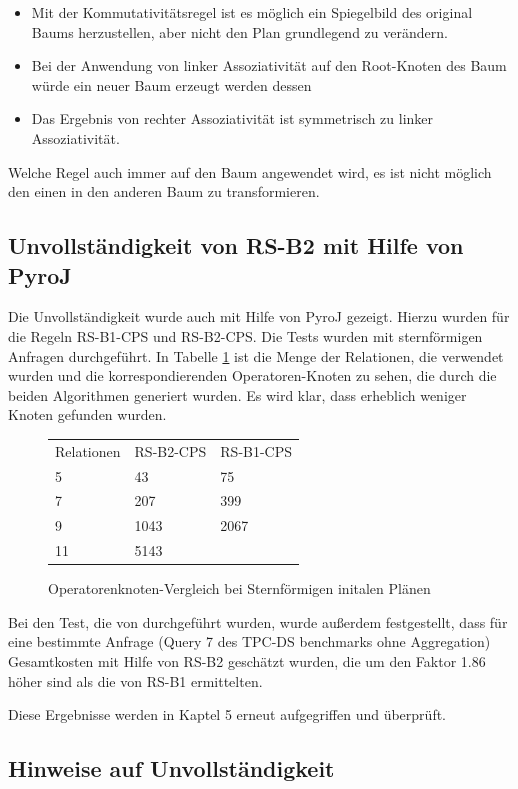 \begin{itemize}
\item Mit der Kommutativitätsregel ist es möglich ein Spiegelbild des original Baums herzustellen, aber nicht den Plan grundlegend zu verändern.
\item Bei der Anwendung von linker Assoziativität auf den Root-Knoten des Baum würde ein neuer Baum erzeugt werden dessen
\item Das Ergebnis von rechter Assoziativität ist symmetrisch zu linker Assoziativität.
\end{itemize}


Welche Regel auch immer auf den Baum angewendet wird, es ist nicht möglich den einen in den anderen Baum zu transformieren.

\subsection{Unvollständigkeit von RS-B2 mit Hilfe von PyroJ}

Die Unvollständigkeit wurde auch mit Hilfe von PyroJ gezeigt. Hierzu wurden für die Regeln RS-B1-CPS und RS-B2-CPS. Die Tests wurden mit sternförmigen Anfragen durchgeführt. In Tabelle \ref{pyroIncomplete} ist die Menge der Relationen, die verwendet wurden und die korrespondierenden Operatoren-Knoten zu sehen, die durch die beiden Algorithmen generiert wurden. Es wird klar, dass erheblich weniger Knoten gefunden wurden. 

\begin{figure}[ht]
\centering

\begin{tabular}{lll}
Relationen & RS-B2-CPS & RS-B1-CPS \\
5          & 43        & 75        \\
7          & 207       & 399       \\
9          & 1043      & 2067      \\
11         & 5143      &          
\end{tabular}
\caption{Operatorenknoten-Vergleich bei Sternförmigen initalen Plänen}
\label{pyroIncomplete}
\end{figure}


Bei den Test, die von \cite{bachelor} durchgeführt wurden, wurde außerdem festgestellt, dass für eine bestimmte Anfrage (Query 7 des TPC-DS benchmarks ohne Aggregation) Gesamtkosten mit Hilfe von RS-B2 geschätzt wurden, die um den Faktor 1.86 höher sind als die von RS-B1 ermittelten.

Diese Ergebnisse werden in Kaptel 5 erneut aufgegriffen und überprüft.




\subsection{Hinweise auf Unvollständigkeit}